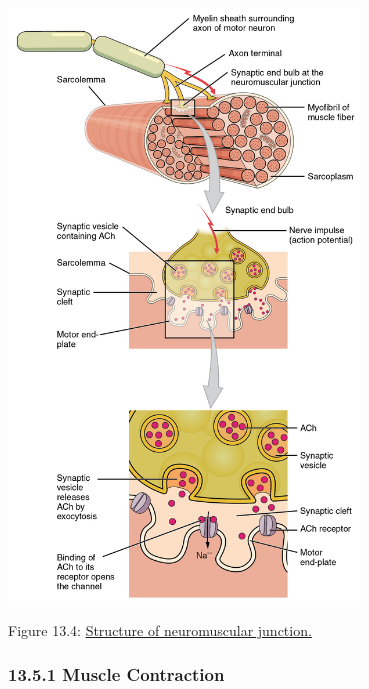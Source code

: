 \protect\hypertarget{fig:neuromuscularjunction}{}{}
\includegraphics[width=0.7\textwidth,height=\textheight]{figures/motor/1009_Motor_End_Plate_and_Innervation.jpg}

Figure 13.4:
\href{https://commons.wikimedia.org/wiki/File:1009_Motor_End_Plate_and_Innervation.jpg}{Structure
of neuromuscular junction.}

\hypertarget{muscle-contraction}{%
\subsubsection{\texorpdfstring{{13.5.1} Muscle
Contraction}{13.5.1 Muscle Contraction}}\label{muscle-contraction}}

